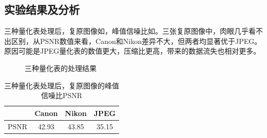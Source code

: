 \documentclass[12pt,a4paper]{article}
\begin{document}
\subsection{实验结果及分析}

三种量化表处理后，复原图像如，峰值信噪比如。三张复原图像中，肉眼几乎看不出区别，从PSNR数值来看，Canon和Nikon差异不大，但两者均显著优于JPEG。原因可能是JPEG量化表的数值更大，压缩比更高，带来的数据流失也相对更多。

\begin{figure}[H]
    \centering
    \caption{三种量化表的处理结果}
    \label{fig:quant_table}
\end{figure}

\begin{table}[H]
    \centering
    \caption{三种量化表处理后，复原图像的峰值信噪比PSNR}
    \label{tab:quant_table_psnr}
    \begin{tabular}{c|ccc}
        \toprule
        & Canon & Nikon & JPEG\tabularnewline
        \midrule
        PSNR & 42.93 & 43.85 & 35.15\tabularnewline
        \bottomrule
    \end{tabular}
\end{table}
\end{document}
